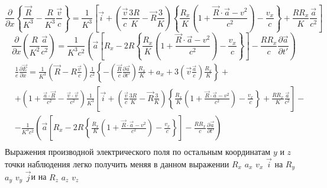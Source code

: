 \documentclass[11pt]{article}
\begin{document}
\[\frac{\partial }{\partial x}\left\{ \frac{\overrightarrow{R}}{{{K}^{3}}}-\frac{R}{{{K}^{3}}}\frac{\overrightarrow{v}}{c} \right\}=\frac{1}{{{K}^{3}}}\left[ \overrightarrow{i}+\left( \frac{\overrightarrow{v}}{c}\frac{3R}{K}-\overrightarrow{R}\frac{3}{K} \right)\left\{ \frac{{{R}_{x}}}{K}\left( 1+\frac{\overrightarrow{R}\cdot \overrightarrow{a}-{{v}^{2}}}{{{c}^{2}}} \right)-\frac{{{v}_{x}}}{c} \right\}+\frac{R{{R}_{x}}}{K}\frac{\overrightarrow{a}}{{{c}^{2}}} \right]\]
\[\frac{\partial }{\partial x}\left( \frac{R}{{{K}^{2}}}\frac{\overrightarrow{a}}{{{c}^{2}}} \right)=\frac{1}{{{K}^{3}}{{c}^{2}}}\left( \overrightarrow{a}\left[ {{R}_{x}}-2R\left\{ \frac{{{R}_{x}}}{K}\left( 1+\frac{\overrightarrow{R}\cdot \overrightarrow{a}-{{v}^{2}}}{{{c}^{2}}} \right)-\frac{{{v}_{x}}}{c} \right\} \right]-\frac{R{{R}_{x}}}{c}\frac{\partial \overrightarrow{a}}{\partial t'} \right)\]
\[\begin{align}
  & \frac{1}{e}\frac{\partial \overrightarrow{E}}{\partial x}=\frac{1}{{{K}^{3}}}\left( \overrightarrow{R}-R\frac{\overrightarrow{v}}{c} \right)\frac{1}{{{c}^{2}}}\left\{ -\left( \frac{\overrightarrow{R}}{c}\frac{\partial \overrightarrow{a}}{\partial t'} \right)\frac{{{R}_{x}}}{K}+{{a}_{x}}+3\left( \overrightarrow{v}\frac{\overrightarrow{a}}{c} \right)\frac{{{R}_{x}}}{K} \right\}+ \\ 
 & +\left( 1+\frac{\overrightarrow{a}\cdot \overrightarrow{R}}{{{c}^{2}}}-\frac{\overrightarrow{v}\cdot \overrightarrow{v}}{{{c}^{2}}} \right)\frac{1}{{{K}^{3}}}\left[ \overrightarrow{i}+\left( \frac{\overrightarrow{v}}{c}\frac{3R}{K}-\overrightarrow{R}\frac{3}{K} \right)\left\{ \frac{{{R}_{x}}}{K}\left( 1+\frac{\overrightarrow{R}\cdot \overrightarrow{a}-{{v}^{2}}}{{{c}^{2}}} \right)-\frac{{{v}_{x}}}{c} \right\}+\frac{R{{R}_{x}}}{K}\frac{\overrightarrow{a}}{{{c}^{2}}} \right]- \\
 & -\frac{1}{{{K}^{3}}{{c}^{2}}}\left( \overrightarrow{a}\left[ {{R}_{x}}-2R\left\{ \frac{{{R}_{x}}}{K}\left( 1+\frac{\overrightarrow{R}\cdot \overrightarrow{a}-{{v}^{2}}}{{{c}^{2}}} \right)-\frac{{{v}_{x}}}{c} \right\} \right]-\frac{R{{R}_{x}}}{c}\frac{\partial \overrightarrow{a}}{\partial t'} \right) \\
\end{align}\] Выражения производной электрического поля по остальным
координатам \(y\) и \(z\) точки наблюдения легко получить меняя в данном
выражении \({{R}_{x}}\) \({{a}_{x}}\) \({{v}_{x}}\)
\(\overrightarrow{i}\) на \({{R}_{y}}\) \({{a}_{y}}\) \({{v}_{y}}\)
\(\overrightarrow{j}\)и на \({{R}_{z}}\) \({{a}_{z}}\) \({{v}_{z}}\)
\end{document}
